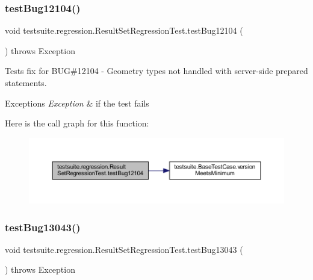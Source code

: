 \subsubsection{\texorpdfstring{test\+Bug12104()}{testBug12104()}}
{\footnotesize\ttfamily void testsuite.\+regression.\+Result\+Set\+Regression\+Test.\+test\+Bug12104 (\begin{DoxyParamCaption}{ }\end{DoxyParamCaption}) throws Exception}

Tests fix for B\+UG\#12104 -\/ Geometry types not handled with server-\/side prepared statements.


\begin{DoxyExceptions}{Exceptions}
{\em Exception} & if the test fails \\
\hline
\end{DoxyExceptions}
Here is the call graph for this function\+:
\nopagebreak
\begin{figure}[H]
\begin{center}
\leavevmode
\includegraphics[width=350pt]{classtestsuite_1_1regression_1_1_result_set_regression_test_a5967a08c14eff5f2158876c10b97da26_cgraph}
\end{center}
\end{figure}
\mbox{\label{classtestsuite_1_1regression_1_1_result_set_regression_test_a06717a5b3c5be030d27a05516d1d2193}} 
\subsubsection{\texorpdfstring{test\+Bug13043()}{testBug13043()}}
{\footnotesize\ttfamily void testsuite.\+regression.\+Result\+Set\+Regression\+Test.\+test\+Bug13043 (\begin{DoxyParamCaption}{ }\end{DoxyParamCaption}) throws Exception}

